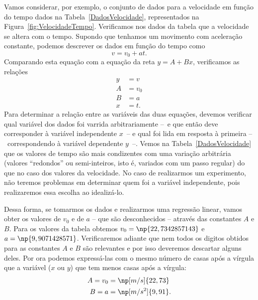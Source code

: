 Vamos considerar, por exemplo, o conjunto de dados para a velocidade em função do tempo dados na Tabela~\ref{DadosVelocidade}, representados na Figura~\ref{fig:VelocidadeTempo}. Verificamos nos dados da tabela que a velocidade se altera com o tempo. Supondo que tenhamos um movimento com aceleração constante, podemos descrever os dados em função do tempo como
\begin{equation}
	v = v_0 + at.
\end{equation}
%
Comparando esta equação com a equação da reta $y = A + Bx$, verificamos as relações
\begin{align}
	y &= v \\
	A &= v_0 \\
	B &= a \\
	x &= t.
\end{align}
%
Para determinar a relação entre as variáveis das duas equações, devemos verificar qual variável dos dados foi varrida arbitrariamente --~e que então deve corresponder à variável independente $x$~-- e qual foi lida em resposta à primeira --~correspondendo à variável dependente $y$~--. Vemos na Tabela~\ref{DadosVelocidade} que os valores de tempo são mais condizentes com uma variação arbitrária (valores ``redondos'' ou semi-inteiros, isto é, variados com um passo regular) do que no caso dos valores da velocidade. No caso de realizarmos um experimento, não teremos problemas em determinar quem foi a variável independente, pois realizaremos essa escolha ao idealizá-lo.

\begin{figure*}
\centering
\forceversofloat
\caption{Gráfico dos dados da Tabela~\ref{DadosVelocidade}.} 
\label{fig:VelocidadeTempo}

\end{figure*}

Dessa forma, se tomarmos os dados e realizarmos uma regressão linear, vamos obter os valores de $v_0$ e de $a$ -- que são desconhecidos -- através das constantes $A$ e $B$. Para os valores da tabela obtemos $v_0 = \np{22,734 285 714 3}$ e $a = \np{9,907 142 857 1}$. Verificaremos adiante que nem todos os digitos obtidos para as constantes $A$ e $B$ são relevantes e por isso deveremos descartar alguns deles. Por ora podemos expressá-las com o mesmo número de casas após a vírgula que a variável ($x$ ou $y$) que tem menos casas após a vírgula:
\begin{align}
	A = v_0 &= \np[m/s]{22,73} \\
	B = a &= \np[m/s^2]{9,91}.
\end{align}



